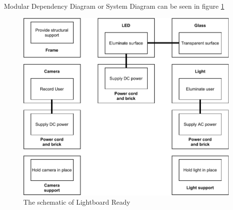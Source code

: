 \documentclass[a4paper]{jpconf}
\begin{document}
Modular Dependency Diagram or System Diagram can be seen in figure \ref{fig:scematic}
\begin{figure}
	\centering
	\includegraphics[width=1\linewidth]{scematic.pdf}
	\caption{The schematic of Lightboard Ready}
	\label{fig:scematic}
\end{figure}
\end{document}
